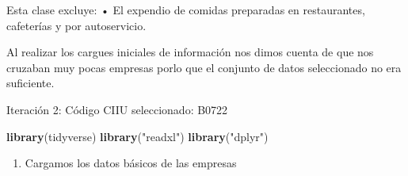 \documentclass[
  11pt,
]{article}
\newenvironment{Shaded}{\begin{snugshade}}{\end{snugshade}}
\newcommand{\KeywordTok}[1]{\textcolor[rgb]{0.13,0.29,0.53}{\textbf{#1}}}
\newcommand{\NormalTok}[1]{#1}
\newcommand{\StringTok}[1]{\textcolor[rgb]{0.31,0.60,0.02}{#1}}
\providecommand{\tightlist}{%
  \setlength{\itemsep}{0pt}\setlength{\parskip}{0pt}}
\begin{document}
Esta clase excluye: • El expendio de comidas preparadas en restaurantes,
cafeterías y por autoservicio.

Al realizar los cargues iniciales de información nos dimos cuenta de que
nos cruzaban muy pocas empresas porlo que el conjunto de datos
seleccionado no era suficiente.

Iteración 2: Código CIIU seleccionado: B0722

\begin{Shaded}
\begin{Highlighting}[]
\KeywordTok{library}\NormalTok{(tidyverse)}
\KeywordTok{library}\NormalTok{(}\StringTok{"readxl"}\NormalTok{)}
\KeywordTok{library}\NormalTok{(}\StringTok{"dplyr"}\NormalTok{)}
\end{Highlighting}
\end{Shaded}

\begin{enumerate}
\def\labelenumi{\arabic{enumi}.}
\tightlist
\item
  Cargamos los datos básicos de las empresas
\end{enumerate}
\end{document}
